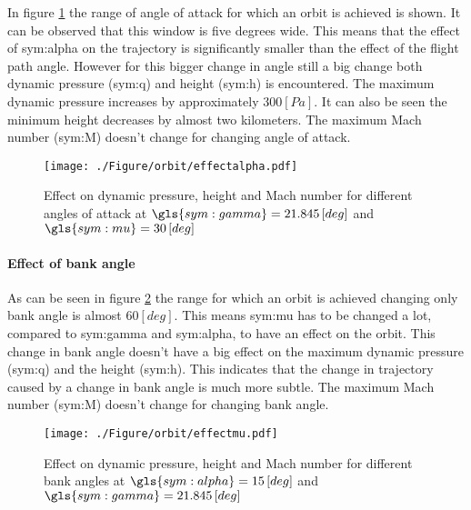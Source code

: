 In figure \ref{fig:effectalpha} the range of angle of attack for which an orbit is achieved is shown. It can be observed that this window is five degrees wide. This means that the effect of \gls{sym:alpha} on the trajectory is significantly smaller than the effect of the flight path angle. However for this bigger change in angle still a big change both dynamic pressure (\gls{sym:q}) and height (\gls{sym:h}) is encountered. The maximum dynamic pressure increases by approximately $300 \left[Pa\right]$. It can also be seen the minimum height decreases by almost two kilometers. The maximum Mach number (\gls{sym:M}) doesn't change for changing angle of attack.
\begin{figure}[H]
	\centering
	\texttt{[image: ./Figure/orbit/effectalpha.pdf]}
	\caption{Effect on dynamic pressure, height and Mach number for different angles of attack at $\gls{sym:gamma}=21.845 \left[deg\right]$ and $\gls{sym:mu}=30 \left[deg\right]$}
	\label{fig:effectalpha}
\end{figure}

\paragraph{Effect of bank angle}

As can be seen in figure \ref{fig:effectmu} the range for which an orbit is achieved changing only bank angle is almost $60 \left[deg\right]$. This means \gls{sym:mu} has to be changed a lot, compared to \gls{sym:gamma} and \gls{sym:alpha}, to have an effect on the orbit. This change in bank angle doesn't have a big effect on the maximum dynamic pressure (\gls{sym:q}) and the height (\gls{sym:h}). This indicates that the change in trajectory caused by a change in bank angle is much more subtle. The maximum Mach number (\gls{sym:M}) doesn't change for changing bank angle.
\begin{figure}[H]
	\centering
	\texttt{[image: ./Figure/orbit/effectmu.pdf]}
	\caption{Effect on dynamic pressure, height and Mach number for different bank angles at $\gls{sym:alpha}=15 \left[deg\right]$ and $\gls{sym:gamma}=21.845 \left[deg\right]$}
	\label{fig:effectmu}
\end{figure}


